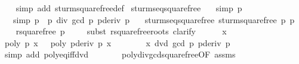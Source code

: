 \begin{isabellebody}
%
\isadelimproof
\ \ %
\endisadelimproof
%
\isatagproof
{}\isamarkupfalse%
\ {\isacharparenleft}simp\ add{\isacharcolon}\ sturm{\isacharunderscore}squarefree{\isacharunderscore}def{\isacharparenright}%
\endisatagproof
{\isafoldproof}%
%
\isadelimproof
\isanewline
%
\endisadelimproof
\isanewline
\isanewline
{}\isamarkupfalse%
\ sturm{\isacharunderscore}seq{\isacharunderscore}squarefree{\isacharcolon}\isanewline
\ \ \ {\isacharbrackleft}simp{\isacharbrackright}{\isacharcolon}\ {\isachardoublequoteopen}p\ {\isasymnoteq}\ {}{\isachardoublequoteclose}\isanewline
\ \ \ {\isacharbrackleft}simp{\isacharbrackright}{\isacharcolon}\ {\isachardoublequoteopen}p{\isacharprime}\ {\isasymequiv}\ p\ div\ gcd\ p\ {\isacharparenleft}pderiv\ p{\isacharparenright}{\isachardoublequoteclose}\isanewline
\ \ \ {\isachardoublequoteopen}sturm{\isacharunderscore}seq{\isacharunderscore}squarefree\ {\isacharparenleft}sturm{\isacharunderscore}squarefree\ p{\isacharparenright}\ p{\isacharprime}{\isachardoublequoteclose}\isanewline
%
\isadelimproof
%
\endisadelimproof
%
\isatagproof
{}\isamarkupfalse%
\isanewline
\ \ \isamarkupfalse%
\ {\isachardoublequoteopen}rsquarefree\ p{\isacharprime}{\isachardoublequoteclose}\ \isanewline
\ \ \isamarkupfalse%
\ {\isacharparenleft}subst\ rsquarefree{\isacharunderscore}roots{\isacharcomma}\ clarify{\isacharparenright}\isanewline
\ \ \ \ \isamarkupfalse%
\ x\ \isamarkupfalse%
\ {\isachardoublequoteopen}poly\ p{\isacharprime}\ x\ {\isacharequal}\ {}{\isachardoublequoteclose}\ {\isachardoublequoteopen}poly\ {\isacharparenleft}pderiv\ p{\isacharprime}{\isacharparenright}\ x\ {\isacharequal}\ {}{\isachardoublequoteclose}\isanewline
\ \ \ \ \isamarkupfalse%
\ {\isachardoublequoteopen}{\isacharbrackleft}{\isacharcolon}{\isacharminus}x{\isacharcomma}{}{\isacharcolon}{\isacharbrackright}\ dvd\ gcd\ p{\isacharprime}\ {\isacharparenleft}pderiv\ p{\isacharprime}{\isacharparenright}{\isachardoublequoteclose}\ \isamarkupfalse%
\ {\isacharparenleft}simp\ add{\isacharcolon}\ poly{\isacharunderscore}eq{\isacharunderscore}{}{\isacharunderscore}iff{\isacharunderscore}dvd{\isacharparenright}\isanewline
\ \ \ \ \isamarkupfalse%
\ \isamarkupfalse%
\ poly{\isacharunderscore}div{\isacharunderscore}gcd{\isacharunderscore}squarefree{\isacharparenleft}{}{\isacharparenright}{\isacharbrackleft}OF\ assms{\isacharparenleft}{}{\isacharparenright}{\isacharbrackright}\isanewline

\end{isabellebody}
